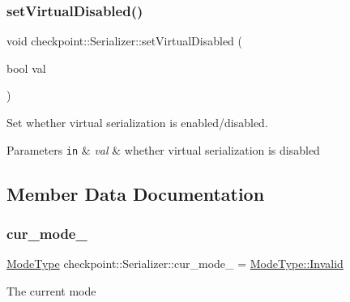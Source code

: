 \subsubsection{\texorpdfstring{set\+Virtual\+Disabled()}{setVirtualDisabled()}}
{\footnotesize\ttfamily void checkpoint\+::\+Serializer\+::set\+Virtual\+Disabled (\begin{DoxyParamCaption}\item[{bool}]{val }\end{DoxyParamCaption})\hspace{0.3cm}{\ttfamily [inline]}}



Set whether virtual serialization is enabled/disabled. 


\begin{DoxyParams}[1]{Parameters}
\mbox{\tt in}  & {\em val} & whether virtual serialization is disabled \\
\hline
\end{DoxyParams}


\subsection{Member Data Documentation}
\mbox{\label{structcheckpoint_1_1_serializer_a89a1f207ad5ff75654cb6d48f432be37}} 
\subsubsection{\texorpdfstring{cur\+\_\+mode\+\_\+}{cur\_mode\_}}
{\footnotesize\ttfamily \hyperlink{namespacecheckpoint_ae2509499ccd8b1dc48fb535bf8aa3059}{Mode\+Type} checkpoint\+::\+Serializer\+::cur\+\_\+mode\+\_\+ = \hyperlink{namespacecheckpoint_ae2509499ccd8b1dc48fb535bf8aa3059a4bbb8f967da6d1a610596d7257179c2b}{Mode\+Type\+::\+Invalid}\hspace{0.3cm}{\ttfamily [protected]}}

The current mode \mbox{\label{structcheckpoint_1_1_serializer_a46ef3c0da77d80853882a7cad641c2af}} 

